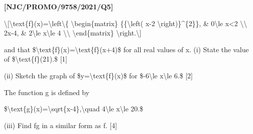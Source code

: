 \item \textbf{{[}NJC/PROMO/9758/2021/Q5{]} }

\textbackslash{[}\textbackslash text\{f\}(x)=\textbackslash left\textbackslash\{
\textbackslash begin\{matrix\} \{\{\textbackslash left( x-2 \textbackslash right)\}\textasciicircum\{2\}\},
\& 0\textbackslash le x<2 \textbackslash\textbackslash{} 2x-4,
\& 2\textbackslash le x\textbackslash le 4 \textbackslash\textbackslash{}
\textbackslash end\{matrix\} \textbackslash right.\textbackslash{]}

and that \$\textbackslash text\{f\}(x)=\textbackslash text\{f\}(x+4)\$
for all real values of x. (i) State the value of \$\textbackslash text\{f\}(21).\$
{[}1{]}

(ii) Sketch the graph of \$y=\textbackslash text\{f\}(x)\$ for \$-6\textbackslash le
x\textbackslash le 6.\$ {[}2{]}

The function g is defined by

\$\textbackslash text\{g\}(x)=\textbackslash sqrt\{x-4\},\textbackslash quad
4\textbackslash le x\textbackslash le 20.\$

(iii) Find fg in a similar form as f. {[}4{]}